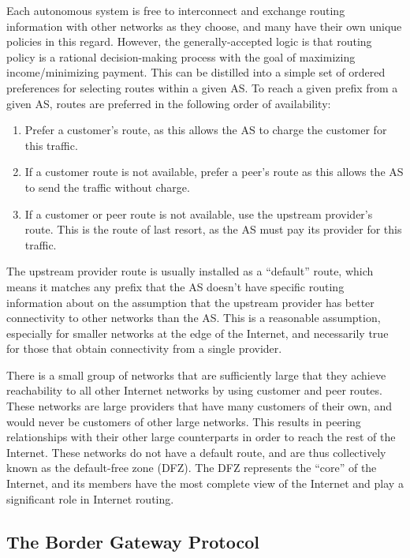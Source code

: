 Each autonomous system is free to interconnect and exchange routing information
with other networks as they choose, and many have their own unique policies in
this regard. However, the generally-accepted logic is that routing policy is a
rational decision-making process with the goal of maximizing income/minimizing
payment. This can be distilled into a simple set of ordered preferences for
selecting routes within a given AS. To reach a given prefix from a given AS,
routes are preferred in the following order of availability:

\begin{enumerate}
    \item{Prefer a customer's route, as this allows the AS to charge the
    customer for this traffic.}
    \item{If a customer route is not available, prefer a peer's route as this
    allows the AS to send the traffic without charge.}
    \item{If a customer or peer route is not available, use the upstream
    provider's route. This is the route of last resort, as the AS must pay its
    provider for this traffic.}
\end{enumerate}

The upstream provider route is usually installed as a ``default'' route, which
means it matches any prefix that the AS doesn't have specific routing
information about on the assumption that the upstream provider has better
connectivity to other networks than the AS. This is a reasonable assumption,
especially for smaller networks at the edge of the Internet, and necessarily
true for those that obtain connectivity from a single provider.

There is a small group of networks that are sufficiently large that they
achieve reachability to all other Internet networks by using customer and peer
routes. These networks are large providers that have many customers of their
own, and would never be customers of other large networks. This results in
peering relationships with their other large counterparts in order to reach the
rest of the Internet. These networks do not have a default route, and are thus
collectively known as the default-free zone (DFZ). The DFZ represents the
``core'' of the Internet, and its members have the most complete view of the
Internet and play a significant role in Internet routing.

\subsection{The Border Gateway Protocol}

